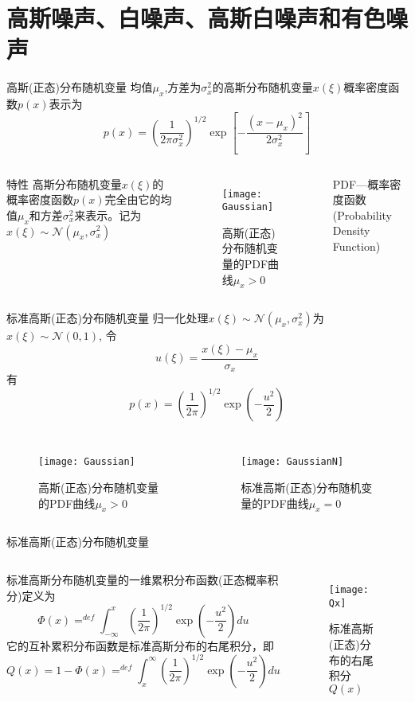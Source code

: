 \section{高斯噪声、白噪声、高斯白噪声和有色噪声}

\begin{frame}{高斯(正态)分布随机变量}
均值$\mu_x$,方差为$\sigma_x^2$的高斯分布随机变量$x(\xi)$概率密度函数$p(x)$表示为
\[p(x)=\left(\frac{1}{2\pi\sigma_x^2}\right)^{1/2}\exp\left[-\frac{(x-\mu_x)^2}{2\sigma_x^2}\right] \]
\begin{columns}
	\begin{block}{特性}
		高斯分布随机变量$x(\xi)$的概率密度函数$p(x)$完全由它的均值$\mu_x$和方差$\sigma_x^2$来表示。记为$x(\xi)\sim\mathcal{N}(\mu_x,\sigma_x^2)$
	\end{block}
	\begin{figure}[!h]
		\centering
		\texttt{[image: Gaussian]}
		\caption{高斯(正态)分布随机变量的PDF曲线$\mu_x>0$}
	\end{figure}
    \tiny PDF---概率密度函数(Probability Density Function)
\end{columns}
\end{frame}

\begin{frame}{标准高斯(正态)分布随机变量}
归一化处理$x(\xi)\sim\mathcal{N}(\mu_x,\sigma_x^2)$为$x(\xi)\sim\mathcal{N}(0,1)$, 令
\[u(\xi)=\frac{x(\xi)-\mu_x}{\sigma_x}\]
有
\[p(x)=\left(\frac{1}{2\pi}\right)^{1/2}\exp\left(-\frac{u^2}{2}\right) \]
\begin{columns}
\begin{figure}[!h]
	\centering
	\texttt{[image: Gaussian]}
	\caption{高斯(正态)分布随机变量的PDF曲线$\mu_x>0$}
\end{figure}
\begin{figure}[!h]
	\centering
	\texttt{[image: GaussianN]}
	\caption{标准高斯(正态)分布随机变量的PDF曲线$\mu_x=0$}
\end{figure}
\end{columns}
\end{frame}

\begin{frame}{标准高斯(正态)分布随机变量}
\begin{columns}
标准高斯分布随机变量的一维累积分布函数(正态概率积分)定义为
\[\Phi(x)\mathop{=}^{def}\int_{-\infty}^{x}\left(\frac{1}{2\pi}\right)^{1/2}\exp\left(-\frac{u^2}{2}\right)du \]
它的互补累积分布函数是标准高斯分布的右尾积分，即
\[Q(x)=1-\Phi(x)\mathop{=}^{def}\int_{x}^{\infty}\left(\frac{1}{2\pi}\right)^{1/2}\exp\left(-\frac{u^2}{2}\right)du \]
\begin{figure}[!h]
\centering
\texttt{[image: Qx]}\\
\caption{标准高斯(正态)分布的右尾积分$Q(x)$}
\end{figure}
\end{columns}
\end{frame}

